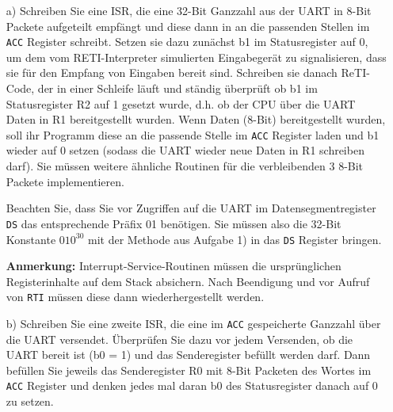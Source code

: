 \documentclass{article}
\begin{document}
\begin{itemize}
\item[a)]
Schreiben Sie eine ISR, die eine 32-Bit Ganzzahl aus der UART in 8-Bit Packete aufgeteilt empfängt und diese dann in an die passenden Stellen im \texttt{ACC} Register schreibt. 
Setzen sie dazu zunächst b1 im Statusregister auf 0, um dem vom RETI-Interpreter simulierten Eingabegerät zu signalisieren, dass sie für den Empfang von Eingaben bereit sind. Schreiben sie danach ReTI-Code, der in einer Schleife läuft und ständig überprüft ob b1 im Statusregister R2 auf 1 gesetzt wurde, d.h. ob der CPU über die UART Daten in R1 bereitgestellt wurden. Wenn Daten (8-Bit) bereitgestellt wurden, soll ihr Programm diese an die passende Stelle im \texttt{ACC} Register laden und b1 wieder auf 0 setzen (sodass die UART wieder neue Daten in R1 schreiben darf). Sie müssen weitere ähnliche Routinen für die verbleibenden 3 8-Bit Packete implementieren.

Beachten Sie, dass Sie vor Zugriffen auf die UART im Datensegmentregister \texttt{DS} das entsprechende Präfix 01 benötigen. Sie müssen also die 32-Bit Konstante $010^{30}$ mit der Methode aus Aufgabe 1) in das \texttt{DS} Register bringen.

\textbf{Anmerkung:} Interrupt-Service-Routinen müssen die ursprünglichen Registerinhalte auf dem Stack absichern. Nach Beendigung und vor Aufruf von \texttt{RTI} müssen diese dann wiederhergestellt werden.

\item[b)]
Schreiben Sie eine zweite ISR, die eine im \texttt{ACC} gespeicherte Ganzzahl über die UART versendet.
Überprüfen Sie dazu vor jedem Versenden, ob die UART bereit ist (b0 = 1) und das Senderegister befüllt werden darf. Dann befüllen Sie jeweils das Senderegister R0 mit 8-Bit Packeten des Wortes im \texttt{ACC} Register und denken jedes mal daran b0 des Statusregister danach auf 0 zu setzen. %
\end{itemize}
\end{document}
